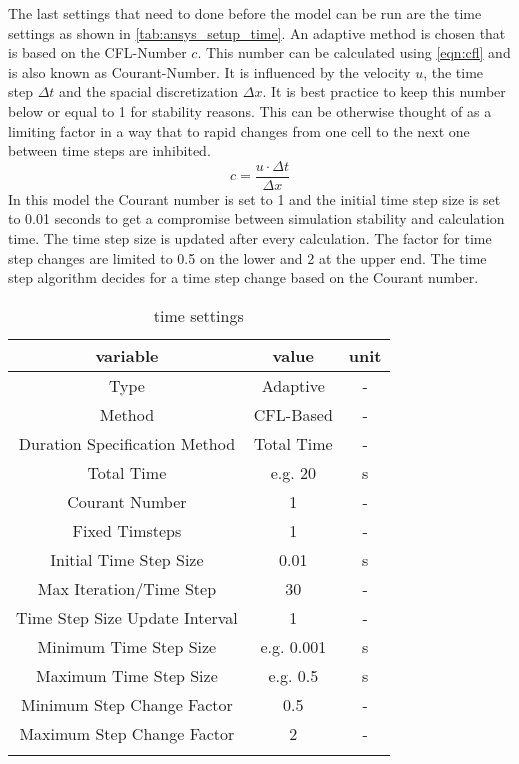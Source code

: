 \documentclass[../thesis.tex]{subfiles}
\begin{document}
The last settings that need to done before the model can be run are the time settings as shown in \autoref{tab:ansys_setup_time}. An adaptive method is chosen that is based on the CFL-Number $c$. This number can be calculated using \autoref{eqn:cfl} and is also known as Courant-Number. It is influenced by the velocity $u$, the time step $ \Delta t$ and the spacial discretization $\Delta x$. It is best practice to keep this number below or equal to 1 for stability reasons. This can be otherwise thought of as a limiting factor in a way that to rapid changes from one cell to the next one between time steps are inhibited.  
\begin{equation}
	\label{eqn:cfl}
	c = \dfrac{u \cdot \Delta t}{\Delta x}
\end{equation}
In this model the Courant number is set to 1 and the initial time step size is set to 0.01 seconds to get a compromise between simulation stability and calculation time. The time step size is updated after every calculation. The factor for time step changes are limited to 0.5 on the lower and 2 at the upper end. The time step algorithm decides for a time step change based on the Courant number. 

\begin{table} [htb]
	\centering
	\caption{time settings}
	\begin{tabular}{ ccc }
		\hline
		variable & value & unit \\
		\hline
		Type & Adaptive & - \\
		Method & CFL-Based & - \\
		Duration Specification Method & Total Time & -\\
		Total Time & e.g. 20 & s \\
		Courant Number & 1 & - \\
		Fixed Timsteps & 1 & - \\
		Initial Time Step Size & 0.01 & s \\
		Max Iteration/Time Step & 30 & - \\
		Time Step Size Update Interval & 1 & - \\
		Minimum Time Step Size & e.g. 0.001 & s \\
		Maximum Time Step Size & e.g. 0.5 & s \\
		Minimum Step Change Factor & 0.5 & - \\
		Maximum Step Change Factor & 2 & - \\		
		\hline
		\label{tab:ansys_setup_time}
	\end{tabular}
\end{table}
\end{document}
